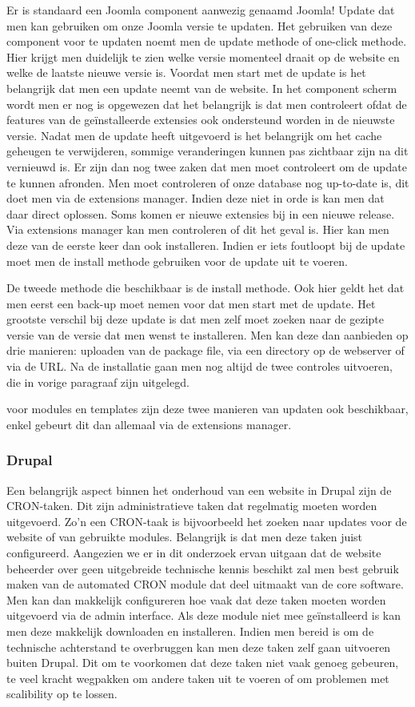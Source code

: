 Er is standaard een Joomla component aanwezig genaamd Joomla! Update dat men kan gebruiken om onze Joomla versie te updaten. Het gebruiken van deze component voor te updaten noemt men de update methode of one-click methode. Hier krijgt men duidelijk te zien welke versie momenteel draait op de website en welke de laatste nieuwe versie is. Voordat men start met de update is het belangrijk dat men een update neemt van de website. In het component scherm wordt men er nog is opgewezen dat het belangrijk is dat men controleert ofdat de features van de geïnstalleerde extensies ook ondersteund worden in de nieuwste versie. Nadat men de update heeft uitgevoerd is het belangrijk om het cache geheugen te verwijderen, sommige veranderingen kunnen pas zichtbaar zijn na dit vernieuwd is. Er zijn dan nog twee zaken dat men moet controleert om de update te kunnen afronden. Men moet controleren of onze database nog up-to-date is, dit doet men via de extensions manager. Indien deze niet in orde is kan men dat daar direct oplossen. Soms komen er nieuwe extensies bij in een nieuwe release. Via extensions manager kan men controleren of dit het geval is. Hier kan men deze van de eerste keer dan ook installeren. Indien er iets foutloopt bij de update moet men de install methode gebruiken voor de update uit te voeren.

De tweede methode die beschikbaar is de install methode. Ook hier geldt het dat men eerst een back-up moet nemen voor dat men start met de update. Het grootste verschil bij deze update is dat men zelf moet zoeken naar de gezipte versie van de versie dat men wenst te installeren. Men kan deze dan aanbieden op drie manieren: uploaden van de package file, via een directory op de webserver of via de URL. Na de installatie gaan men nog altijd de twee controles uitvoeren, die in vorige paragraaf zijn uitgelegd.

voor modules en templates zijn deze twee manieren van updaten ook beschikbaar, enkel gebeurt dit dan allemaal via de extensions manager.


\subsubsection{Drupal}
Een belangrijk aspect binnen het onderhoud van een website in Drupal zijn de CRON-taken. Dit zijn administratieve taken dat regelmatig moeten worden uitgevoerd. Zo'n een CRON-taak is bijvoorbeeld het zoeken naar updates voor de website of van gebruikte modules. Belangrijk is dat men deze taken juist configureerd. Aangezien we er in dit onderzoek ervan uitgaan dat de website beheerder over geen uitgebreide technische kennis beschikt zal men best gebruik maken van de automated CRON module dat deel uitmaakt van de core software. Men kan dan makkelijk configureren hoe vaak dat deze taken moeten worden uitgevoerd via de admin interface. Als deze module niet mee geïnstalleerd is kan men deze makkelijk downloaden en installeren. Indien men bereid is om de technische achterstand te overbruggen kan men deze taken zelf gaan uitvoeren buiten Drupal. Dit om te voorkomen dat deze taken niet vaak genoeg gebeuren, te veel kracht wegpakken om andere taken uit te voeren of om problemen met scalibility op te lossen.

